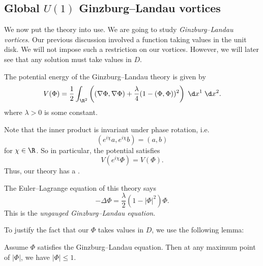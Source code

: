\documentclass[a4paper]{article}
\begin{document}
%

\subsection{Global \texorpdfstring{$U(1)$}{U(1)} Ginzburg--Landau vortices}
We now put the theory into use. We are going to study \emph{Ginzburg--Landau vortices}. Our previous discussion involved a function taking values in the unit disk. We will not impose such a restriction on our vortices. However, we will later see that any solution must take values in $D$.

The potential energy of the Ginzburg--Landau theory is given by
\[
  V(\Phi) = \frac{1}{2} \int_{\R^2} \left((\nabla \Phi, \nabla \Phi) + \frac{\lambda}{4} (1 - (\Phi, \Phi))^2 \right)\;\d x^1 \;\d x^2.
\]
where $\lambda > 0$ is some constant.

Note that the inner product is invariant under phase rotation, i.e.
\[
  (e^{i\chi} a, e^{i\chi}b) = (a, b)
\]
for $\chi \in \R$. So in particular, the potential satisfies
\[
  V(e^{i\chi}\Phi) = V(\Phi).
\]
Thus, our theory has a .

The Euler--Lagrange equation of this theory says
\[
  - \Delta \Phi = \frac{\lambda}{2}(1 - |\Phi|^2) \Phi.
\]
This is the \emph{ungauged Ginzburg--Landau equation}.

To justify the fact that our $\Phi$ takes values in $D$, we use the following lemma:
\begin{lemma}
  Assume $\Phi$ satisfies the Ginzburg--Landau equation. Then at any maximum point of $|\Phi|$, we have $|\Phi| \leq 1$.
\end{lemma}
\end{document}
